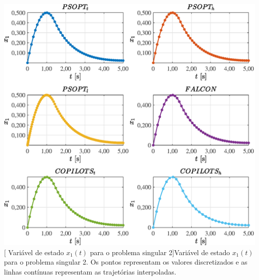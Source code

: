\noindent
\begin{minipage}{\textwidth}
	\vspace{\onelineskip}
	\centering
	\includegraphics[scale=0.70]{fig/resultados/singular2/traj/x/x_1}
	[	Variável de estado $x_1(t)$ para o problema singular 2]{Variável de estado $x_1(t)$ para o problema singular 2. Os pontos representam os valores discretizados e as linhas contínuas representam as trajetórias interpoladas.}
	\label{fig:singular2:x:x1}
	\vspace{\onelineskip}
\end{minipage}

